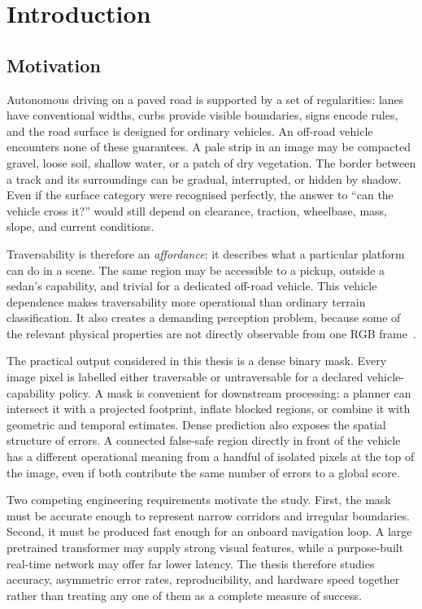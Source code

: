 \chapter{Introduction}
\label{ch:introduction}

\section{Motivation}

Autonomous driving on a paved road is supported by a set of regularities:
lanes have conventional widths, curbs provide visible boundaries, signs encode
rules, and the road surface is designed for ordinary vehicles. An off-road
vehicle encounters none of these guarantees. A pale strip in an image may be
compacted gravel, loose soil, shallow water, or a patch of dry vegetation.
The border between a track and its surroundings can be gradual, interrupted,
or hidden by shadow. Even if the surface category were recognised perfectly,
the answer to ``can the vehicle cross it?'' would still depend on clearance,
traction, wheelbase, mass, slope, and current conditions.

Traversability is therefore an \emph{affordance}: it describes what a particular
platform can do in a scene. The same region may be accessible to a pickup,
outside a sedan's capability, and trivial for a dedicated off-road vehicle. This
vehicle dependence makes traversability more operational than ordinary
terrain classification. It also creates a demanding perception problem,
because some of the relevant physical properties are not directly observable
from one RGB frame~\cite{islam2022review,sevastopoulos2022survey}.

The practical output considered in this thesis is a dense binary mask. Every
image pixel is labelled either traversable or untraversable for a declared
vehicle-capability policy. A mask is convenient for downstream processing: a
planner can intersect it with a projected footprint, inflate blocked regions,
or combine it with geometric and temporal estimates. Dense prediction also
exposes the spatial structure of errors. A connected false-safe region directly
in front of the vehicle has a different operational meaning from a handful of
isolated pixels at the top of the image, even if both contribute the same
number of errors to a global score.

Two competing engineering requirements motivate the study. First, the mask
must be accurate enough to represent narrow corridors and irregular
boundaries. Second, it must be produced fast enough for an onboard navigation
loop. A large pretrained transformer may supply strong visual features, while
a purpose-built real-time network may offer far lower latency. The thesis
therefore studies accuracy, asymmetric error rates, reproducibility, and
hardware speed together rather than treating any one of them as a complete
measure of success.

